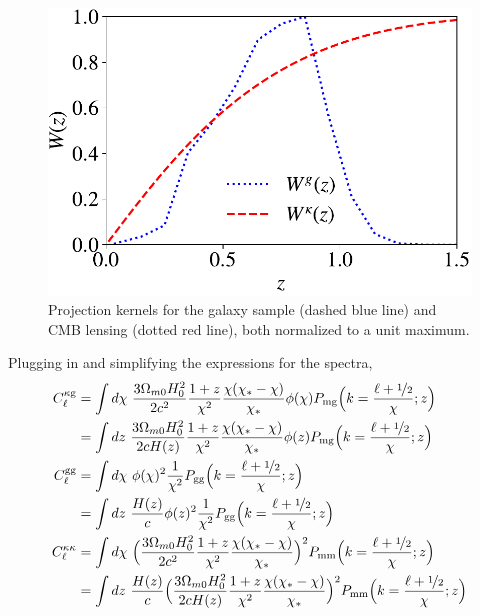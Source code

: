 \begin{figure}
\includegraphics[width=\linewidth]{figures/windows.pdf}
\caption{Projection kernels for the galaxy sample (dashed blue line) and CMB lensing (dotted red line), both normalized to a unit maximum.}
\label{fig:kernels}
\end{figure}

Plugging in and simplifying the expressions for the spectra,
\begin{align}\label{eq:simplified_cells}
    C_{\ell}^{\rm \kappa g} &= \int d\chi \ \frac{3\Omega_{m0}H_0^2}{2c^2} \frac{1+z}{\chi^2}\frac{\chi(\chi_{\rm *}-\chi)}{\chi_{\rm *}}\phi(\chi)P_{\rm mg}{\Big (}k = \frac{\ell + 
\nicefrac{1}{2}}{\chi}; z{\Big )} \nonumber \\ %
    &= \int dz \ \frac{3\Omega_{m0}H_0^2}{2cH(z)} \frac{1+z}{\chi^2}\frac{\chi(\chi_{\rm *}-\chi)}{\chi_{\rm *}}\phi(z)P_{\rm mg}{\Big (}k = \frac{\ell + 
\nicefrac{1}{2}}{\chi}; z{\Big )}\nonumber \\ %
    C_{\ell}^{\rm gg} &= \int d\chi \ \phi(\chi)^2 \frac{1}{\chi^2} P_{\rm gg}{\Big (}k = \frac{\ell + 
\nicefrac{1}{2}}{\chi}; z{\Big )} \\ %
    &= \int dz \ \frac{H(z)}{c} \phi(z)^2 \frac{1}{\chi^2} P_{\rm gg}{\Big (}k = \frac{\ell + 
\nicefrac{1}{2}}{\chi}; z{\Big )} \nonumber \\ %
    C_{\ell}^{\kappa\kappa} &= \int d\chi \ {\Big (}\frac{3\Omega_{m0}H_0^2}{2c^2} \frac{1+z}{\chi^2}\frac{\chi(\chi_{\rm *}-\chi)}{\chi_{\rm *}}{\Big )}^2P_{\rm mm}{\Big (}k = \frac{\ell + 
\nicefrac{1}{2}}{\chi}; z{\Big )} \nonumber \\
    &= \int dz \ \frac{H(z)}{c}{\Big (}\frac{3\Omega_{m0}H_0^2}{2cH(z)} \frac{1+z}{\chi^2}\frac{\chi(\chi_{\rm *}-\chi)}{\chi_{\rm *}}{\Big )}^2P_{\rm mm}{\Big (}k = \frac{\ell + 
\nicefrac{1}{2}}{\chi}; z{\Big )} \nonumber
\end{align}

